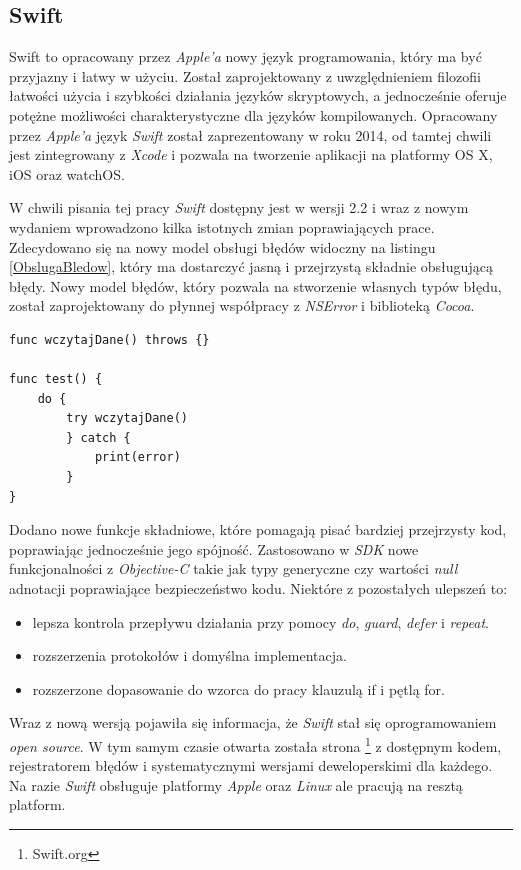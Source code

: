 \documentclass{iiuwb}
\begin{document}
\subsection{Swift}
Swift \cite{Lassoff:2014:Swift} to opracowany przez \textit{Apple'a} nowy język programowania, który ma być przyjazny i łatwy w użyciu. Został zaprojektowany z uwzględnieniem filozofii łatwości użycia i szybkości działania języków skryptowych, a jednocześnie oferuje potężne możliwości charakterystyczne dla języków kompilowanych.  Opracowany przez \textit{Apple'a} język \textit{Swift} został zaprezentowany w roku 2014, od tamtej chwili jest zintegrowany z \textit{Xcode} i pozwala na tworzenie aplikacji na platformy OS X, iOS oraz watchOS. 

W chwili pisania tej pracy \textit{Swift} dostępny jest w wersji 2.2 i wraz z nowym wydaniem wprowadzono kilka istotnych zmian poprawiających prace. Zdecydowano się na nowy model obsługi błędów widoczny na listingu \ref{ObslugaBledow}, który ma dostarczyć jasną i przejrzystą składnie obsługującą błędy. Nowy model błędów, który pozwala na stworzenie własnych typów błędu, został zaprojektowany do płynnej współpracy z \textit{NSError} i biblioteką \textit{Cocoa}.
\begin{lstlisting}[label=ObslugaBledow, caption=Nowy model obsługi błedów w Swift]
func wczytajDane() throws {}

func test() {
	do {
		try wczytajDane()
		} catch {
			print(error)
		}
}
\end{lstlisting}
Dodano nowe funkcje składniowe, które pomagają pisać bardziej przejrzysty kod, poprawiając jednocześnie jego spójność. Zastosowano w \textit{SDK} nowe funkcjonalności z \textit{Objective-C} takie jak typy generyczne czy wartości \textit{null} adnotacji poprawiające bezpieczeństwo kodu. Niektóre z pozostałych ulepszeń to:
\begin{itemize}
\item lepsza kontrola przepływu działania przy pomocy \textit{do}, \textit{guard}, \textit{defer} i \textit{repeat}.    
\item rozszerzenia protokołów i domyślna implementacja.
\item rozszerzone dopasowanie do wzorca do pracy klauzulą if i pętlą for.
\end{itemize}
Wraz z nową wersją pojawiła się informacja, że \textit{Swift} stał się oprogramowaniem \textit{open source}. W tym samym czasie otwarta została strona \footnote{Swift.org} z dostępnym kodem, rejestratorem błędów i systematycznymi wersjami deweloperskimi dla każdego. Na razie \textit{Swift} obsługuje platformy \textit{Apple} oraz \textit{Linux} ale pracują na resztą platform.
\end{document}
